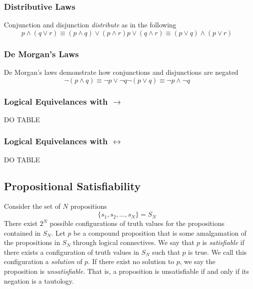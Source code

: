 \documentclass[twocolumn]{report}
\begin{document}
\subsubsection{Distributive Laws}
Conjunction and disjunction \textit{distribute} as in the following 
\begin{subequations}
	\begin{equation}
		p\wedge(q\lor r)\equiv(p\wedge q)\lor(p\wedge r)
		\label{eqn: conjunction-distributivity}
	\end{equation}
	\begin{equation}
		p\lor(q\wedge r)\equiv(p\lor q)\wedge(p\lor r)
		\label{eqn: disjunction-distributivity}
	\end{equation}
\end{subequations}
\subsubsection{De Morgan's Laws}
De Morgan's laws demonstrate how conjunctions and disjunctions are negated
\begin{subequations}
	\label{eqn: demorgan-laws}
	\begin{equation}
		\neg (p\wedge q) \equiv \neg p \lor \neg q
		\label{eqn: negation-of-conjunction}
	\end{equation}
	\begin{equation}
		\neg (p\lor q) \equiv \neg p \wedge \neg q
		\label{eqn: negation-of-disjunction}
	\end{equation}
\end{subequations}
\subsubsection{Logical Equivelances with $\rightarrow$}
DO TABLE
\subsubsection{Logical Equivelances with $\leftrightarrow$}
DO TABLE

\subsection{Propositional Satisfiability}
Consider the set of $N$ propositions 
\[
	\{s_{1}, s_{2}, \dots, s_{N}\} = S_{N}
\]
There exist $2^{N}$ possible configurations of truth values for the propositions contained in $S_{N}$.
Let $p$ be a compound proposition that is some amalgamation of the propositions in $S_{N}$ through logical connectives. 
We say that $p$ is \textit{satisfiable} if there exists a configuration of truth values in $S_{N}$ such that $p$ is true.
We call this configuration a \textit{solution} of $p$.
If there exist no solution to $p$, we say the proposition is \textit{unsatisfiable}.
That is, a proposition is unsatisfiable if and only if its negation is a tautology. 
\end{document}
